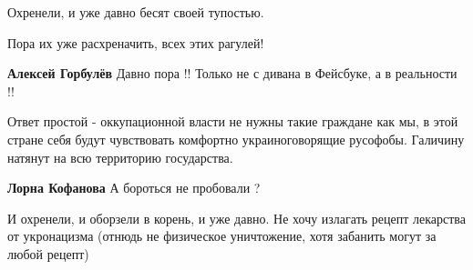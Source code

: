 \begin{itemize}
Охренели, и уже давно бесят своей тупостью.

 
Пора их уже расхреначить, всех этих рагулей!

\begin{itemize}
 
\textbf{Алексей Горбулёв} Давно пора !! Только не с дивана в Фейсбуке, а в реальности !!
\end{itemize}

 

Ответ простой - оккупационной власти не нужны такие граждане как мы, в этой
стране себя будут чувствовать комфортно украиноговорящие русофобы. Галичину
натянут на всю территорию государства.

\begin{itemize}
 
\textbf{Лорна Кофанова} А бороться не пробовали ?
\end{itemize}

 

И охренели, и оборзели в корень, и уже давно. Не хочу излагать рецепт лекарства
от укронацизма (отнюдь не физическое уничтожение, хотя забанить могут за любой
рецепт)


 


\end{itemize}
